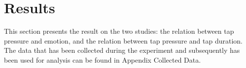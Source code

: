 \documentclass{sigchi}
\begin{document}








\section{Results} %
\label{sec:results}{}
This section presents the result on the two studies: the relation between tap pressure and emotion, and the relation between tap pressure and tap duration. The data that has been collected during the experiment and subsequently has been used for analysis can be found in Appendix Collected Data.
\end{document}
